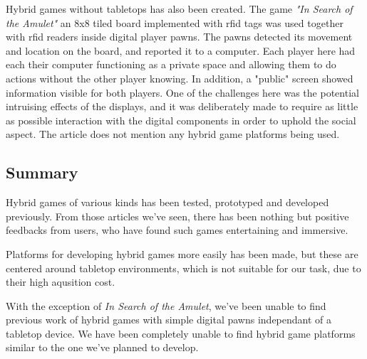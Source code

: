 Hybrid games without tabletops has also been created. The game \emph{"In Search of the Amulet"}\cite{magerkurth2012hybrid} an 8x8 tiled board  implemented with rfid tags was used together with rfid readers inside digital player pawns. The pawns detected its movement and location on the board, and reported it to a computer. Each player here had each their computer functioning as a private space and allowing them to do actions without the other player knowing. In addition, a "public" screen showed information visible for both players. One of the challenges here was the potential intruising effects of the displays, and it was deliberately made to require as little as possible interaction with the digital components in order to uphold the social aspect. The article does not mention any hybrid game platforms being used.

\subsection{Summary}
Hybrid games of various kinds has been tested, prototyped and developed previously. From those articles we've seen, there has been nothing but  positive feedbacks from users, who have found such games entertaining and immersive.

Platforms for developing hybrid games more easily has been made, but these are centered around tabletop environments, which is not suitable for our task, due to their high aqusition cost.

With the exception of \emph{In Search of the Amulet}\cite{magerkurth2012hybrid}, we've been unable to find previous work of hybrid games with simple digital pawns independant of a tabletop device. We have been completely unable to find hybrid game platforms similar to the one we've planned to develop.









\newpage